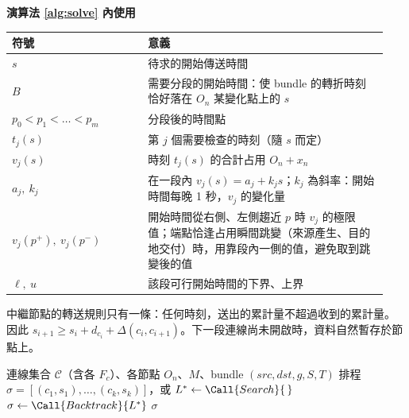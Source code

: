 \medskip
\noindent\textbf{演算法 \ref{alg:solve} 內使用}

\noindent\begin{tabular}{p{0.34\linewidth}p{0.6\linewidth}}
\hline
符號 & 意義 \\
\hline
$s$ & 待求的開始傳送時間 \\
$B$ & 需要分段的開始時間：使 bundle 的轉折時刻恰好落在 $O_n$ 某變化點上的 $s$ \\
$p_0<p_1<\dots<p_m$ & 分段後的時間點 \\
$t_j(s)$ & 第 $j$ 個需要檢查的時刻（隨 $s$ 而定） \\
$v_j(s)$ & 時刻 $t_j(s)$ 的合計占用 $O_n + x_n$ \\
$a_j,\ k_j$ & 在一段內 $v_j(s) = a_j + k_j s$；$k_j$ 為斜率：開始時間每晚 1 秒，$v_j$ 的變化量 \\
$v_j(p^{+}),\ v_j(p^{-})$ & 開始時間從右側、左側趨近 $p$ 時 $v_j$ 的極限值；端點恰逢占用瞬間跳變（來源產生、目的地交付）時，用靠段內一側的值，避免取到跳變後的值 \\
$\ell,\ u$ & 該段可行開始時間的下界、上界 \\
\hline
\end{tabular}

\medskip
\noindent 中繼節點的轉送規則只有一條：任何時刻，送出的累計量不超過收到的累計量。
因此 $s_{i+1} \ge s_i + d_{c_i} + \Delta(c_i, c_{i+1})$。下一段連線尚未開啟時，資料自然暫存於節點上。

\begin{algorithm}[htbp]
\caption{單一 bundle 的路由與排程}
\label{alg:plan}
\begin{algorithmic}[1]
\Require 連線集合 $\mathcal{C}$（含各 $F_c$）、各節點 $O_n$、$M$、bundle $(\mathit{src},\mathit{dst},g,S,T)$
\Ensure 排程 $\sigma=[(c_1,s_1),\dots,(c_k,s_k)]$，或 \Fail
{} \State \Return \Fail \EndIf
\State $L^\ast \gets \Call{Search}{\,}$ 
 \State \Return \Fail \EndIf
\State $\sigma \gets \Call{Backtrack}{L^\ast}$ 
 \State \Return \Fail \EndIf
\State {} 
\State \Return $\sigma$
\end{algorithmic}
\end{algorithm}

